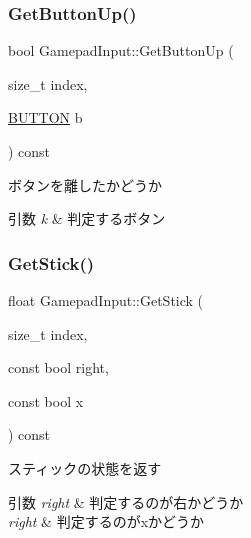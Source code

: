 \subsubsection{\texorpdfstring{Get\+Button\+Up()}{GetButtonUp()}}
{\footnotesize\ttfamily bool Gamepad\+Input\+::\+Get\+Button\+Up (\begin{DoxyParamCaption}\item[{size\+\_\+t}]{index,  }\item[{\mbox{\hyperlink{gamepad__input_8h_a739845b0076428add52ca3cec492e705}{B\+U\+T\+T\+ON}}}]{b }\end{DoxyParamCaption}) const\hspace{0.3cm}{\ttfamily [inline]}}



ボタンを離したかどうか 


\begin{DoxyParams}{引数}
{\em k} & 判定するボタン \\
\hline
\end{DoxyParams}
\mbox{\label{class_gamepad_input_a82333353a23ea0fa92bb87d6cf6592d8}} 
\subsubsection{\texorpdfstring{Get\+Stick()}{GetStick()}}
{\footnotesize\ttfamily float Gamepad\+Input\+::\+Get\+Stick (\begin{DoxyParamCaption}\item[{size\+\_\+t}]{index,  }\item[{const bool}]{right,  }\item[{const bool}]{x }\end{DoxyParamCaption}) const\hspace{0.3cm}{\ttfamily [inline]}}



スティックの状態を返す 


\begin{DoxyParams}{引数}
{\em right} & 判定するのが右かどうか \\
\hline
{\em right} & 判定するのがxかどうか \\
\hline
\end{DoxyParams}
\mbox{\label{class_gamepad_input_a7e95e2a49cbd4729cf7156b9a703252a}} 
